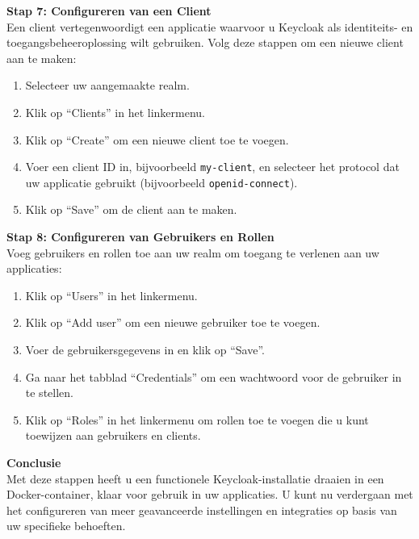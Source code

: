 \textbf{Stap 7: Configureren van een Client}\\
Een client vertegenwoordigt een applicatie waarvoor u Keycloak als identiteits- en toegangsbeheeroplossing wilt gebruiken. Volg deze stappen om een nieuwe client aan te maken:
\begin{enumerate}
    \item Selecteer uw aangemaakte realm.
    \item Klik op ``Clients'' in het linkermenu.
    \item Klik op ``Create'' om een nieuwe client toe te voegen.
    \item Voer een client ID in, bijvoorbeeld \texttt{my-client}, en selecteer het protocol dat uw applicatie gebruikt (bijvoorbeeld \texttt{openid-connect}).
    \item Klik op ``Save'' om de client aan te maken.
\end{enumerate}
\textbf{Stap 8: Configureren van Gebruikers en Rollen}\\
Voeg gebruikers en rollen toe aan uw realm om toegang te verlenen aan uw applicaties:
\begin{enumerate}
    \item Klik op ``Users'' in het linkermenu.
    \item Klik op ``Add user'' om een nieuwe gebruiker toe te voegen.
    \item Voer de gebruikersgegevens in en klik op ``Save''.
    \item Ga naar het tabblad ``Credentials'' om een wachtwoord voor de gebruiker in te stellen.
    \item Klik op ``Roles'' in het linkermenu om rollen toe te voegen die u kunt toewijzen aan gebruikers en clients.
\end{enumerate}
\textbf{Conclusie}\\
Met deze stappen heeft u een functionele Keycloak-installatie draaien in een Docker-container, klaar voor gebruik in uw applicaties. U kunt nu verdergaan met het configureren van meer geavanceerde instellingen en integraties op basis van uw specifieke behoeften.


